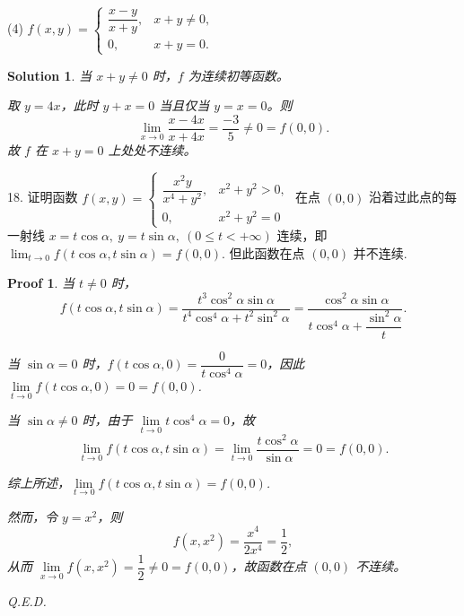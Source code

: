 \documentclass[a4paper,12pt]{article}
\newtheorem*{pf}{Proof}
\newtheorem*{sol}{Solution}
\begin{document}
(4) $f(x,y) =
    \begin{cases}
        \dfrac{x-y}{x+y}, & x + y \neq 0, \\
        0,                & x + y = 0.
    \end{cases}$
\begin{sol}
    当 $x + y \neq 0$ 时，$f$ 为连续初等函数。

    取 $y=4x$，此时 $y+x=0$ 当且仅当 $y=x=0$。则
    $$\lim_{x\to 0}\frac{x-4x}{x+4x}=\frac{-3}{5}\neq 0=f(0,0).$$
    故 $f$ 在 $x+y=0$ 上处处不连续。
\end{sol}


18. 证明函数 $f(x,y) =
    \begin{cases}
        \dfrac{x^2 y}{x^4 + y^2}, & x^2 + y^2 > 0, \\
        0,                        & x^2 + y^2 = 0
    \end{cases}$
在点 $(0,0)$ 沿着过此点的每一射线 $x = t \cos \alpha,\ y = t \sin \alpha,\ (0 \leqslant t < +\infty)$ 连续，即 $\lim_{t \to 0} f(t \cos \alpha, t \sin \alpha) = f(0,0)$. 但此函数在点 $(0,0)$ 并不连续.
\begin{pf}
    当 $t\neq 0$ 时，
    $$f(t \cos \alpha, t \sin \alpha)=\dfrac{t^3\cos^2\alpha\sin\alpha}{t^4\cos^4\alpha + t^2\sin^2\alpha}=\frac{\cos^2\alpha\sin\alpha}{t\cos^4\alpha+\dfrac{\sin^2\alpha}{t}}.$$

    当 $\sin\alpha=0$ 时，$f(t\cos\alpha,0)=\dfrac{0}{t\cos^4\alpha}=0$，因此 $\lim\limits_{t\to 0}f(t\cos\alpha,0)=0=f(0,0)$.

    当 $\sin\alpha\neq 0$ 时，由于 $\lim\limits_{t\to 0}t\cos^4\alpha=0$，故
    $$\lim_{t\to 0}f(t \cos \alpha, t \sin \alpha)=\lim_{t\to 0}\frac{t\cos^2\alpha}{\sin\alpha}=0=f(0,0).$$

    综上所述，$\lim\limits_{t \to 0} f(t \cos \alpha, t \sin \alpha) = f(0,0)$.

    然而，令 $y=x^2$，则
    $$f(x,x^2)=\frac{x^4}{2x^4}=\frac{1}{2},$$
    从而 $\lim\limits_{x\to 0}f(x,x^2)=\dfrac{1}{2}\neq 0=f(0,0)$，故函数在点 $(0,0)$ 不连续。

    Q.E.D.
\end{pf}
\end{document}
